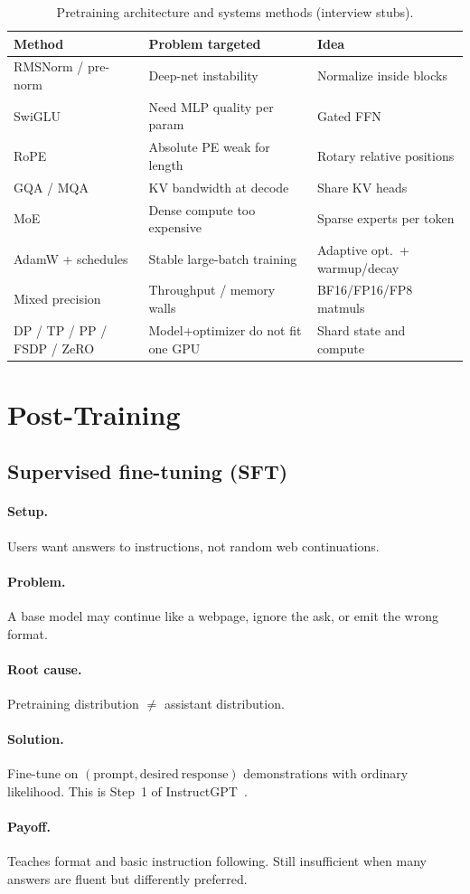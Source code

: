 \documentclass[11pt,a4paper]{article}
\newcommand{\layer}[1]{\paragraph{#1.}}
\newcommand{\setup}{\layer{Setup}}
\newcommand{\problem}{\layer{Problem}}
\newcommand{\rootcause}{\layer{Root cause}}
\newcommand{\solution}{\layer{Solution}}
\newcommand{\payoff}{\layer{Payoff}}
\begin{document}
\begin{table}[ht]
\centering
\small
\begin{tabularx}{\textwidth}{@{}lYY@{}}
\toprule
\textbf{Method} & \textbf{Problem targeted} & \textbf{Idea} \\
\midrule
RMSNorm / pre-norm & Deep-net instability & Normalize inside blocks \\
SwiGLU & Need MLP quality per param & Gated FFN \\
RoPE & Absolute PE weak for length & Rotary relative positions \\
GQA / MQA & KV bandwidth at decode & Share KV heads \\
MoE & Dense compute too expensive & Sparse experts per token \\
AdamW + schedules & Stable large-batch training & Adaptive opt.\ + warmup/decay \\
Mixed precision & Throughput / memory walls & BF16/FP16/FP8 matmuls \\
DP / TP / PP / FSDP / ZeRO & Model+optimizer do not fit one GPU & Shard state and compute \\
\bottomrule
\end{tabularx}
\caption{Pretraining architecture and systems methods (interview stubs).}
\label{tab:pre-knobs}
\end{table}

\section{Post-Training}
\label{sec:post}

\subsection{Supervised fine-tuning (SFT)}
\label{sec:sft}

\setup
Users want answers to instructions, not random web continuations.

\problem
A base model may continue like a webpage, ignore the ask, or emit the wrong format.

\rootcause
Pretraining distribution \(\neq\) assistant distribution.

\solution
Fine-tune on \((\mathrm{prompt},\mathrm{desired\ response})\) demonstrations with ordinary likelihood.
This is Step~1 of InstructGPT~\cite{ouyang2022instructgpt}.

\payoff
Teaches format and basic instruction following.
Still insufficient when many answers are fluent but differently preferred.
\end{document}
